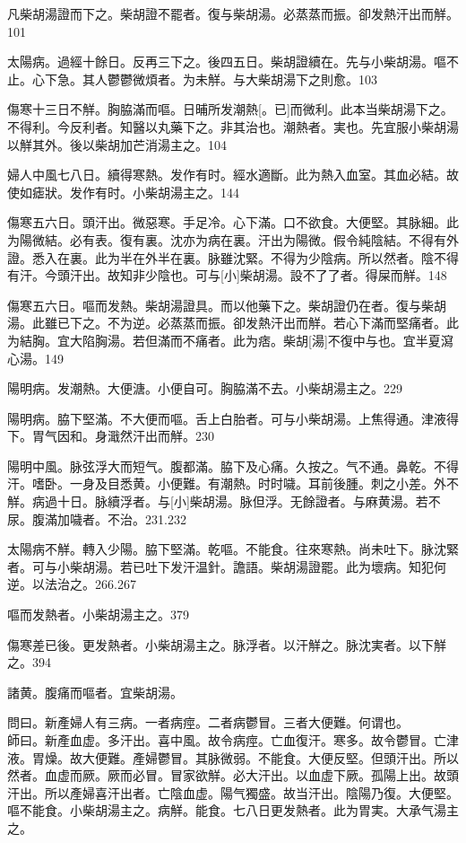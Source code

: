 \documentclass[12pt,oneside,UTF8,b5paper]{ctexbook}她她她她她她她
\begin{document}
凡柴胡湯證而下之。柴胡證不罷者。復与柴胡湯。必蒸蒸而振。卻发熱汗出而觧。101

太陽病。過經十餘日。反再三下之。後四五日。柴胡證續在。先与小柴胡湯。嘔不止。心下急。其人鬱鬱微煩者。为未觧。与大柴胡湯下之則愈。103

傷寒十三日不觧。胸脇滿而嘔。日晡所发潮熱[。已]而微利。此本当柴胡湯下之。不得利。今反利者。知醫以丸藥下之。非其治也。潮熱者。実也。先宜服小柴胡湯以觧其外。後以柴胡加芒消湯主之。104

婦人中風七八日。續得寒熱。发作有时。經水適斷。此为熱入血室。其血必結。故使如瘧狀。发作有时。小柴胡湯主之。144

傷寒五六日。頭汗出。微惡寒。手足冷。心下滿。口不欲食。大便堅。其脉細。此为陽微結。必有表。復有裏。沈亦为病在裏。汗出为陽微。假令純陰結。不得有外證。悉入在裏。此为半在外半在裏。脉雖沈緊。不得为少陰病。所以然者。陰不得有汗。今頭汗出。故知非少陰也。可与[小]柴胡湯。設不了了者。得屎而觧。148

傷寒五六日。嘔而发熱。柴胡湯證具。而以他藥下之。柴胡證仍在者。復与柴胡湯。此雖已下之。不为逆。必蒸蒸而振。卻发熱汗出而觧。若心下滿而堅痛者。此为結胸。宜大陷胸湯。若但滿而不痛者。此为痞。柴胡[湯]不復中与也。宜半夏瀉心湯。149

陽明病。发潮熱。大便溏。小便自可。胸脇滿不去。小柴胡湯主之。229

陽明病。脇下堅滿。不大便而嘔。舌上白胎者。可与小柴胡湯。上焦得通。津液得下。胃气因和。身濈然汗出而觧。230

陽明中風。脉弦浮大而短气。腹都滿。脇下及心痛。久按之。气不通。鼻乾。不得汗。嗜卧。一身及目悉黄。小便難。有潮熱。时时噦。耳前後腫。刺之小差。外不觧。病過十日。脉續浮者。与[小]柴胡湯。脉但浮。无餘證者。与麻黄湯。若不尿。腹滿加噦者。不治。231.232

太陽病不觧。轉入少陽。脇下堅滿。乾嘔。不能食。往來寒熱。尚未吐下。脉沈緊者。可与小柴胡湯。若已吐下发汗温針。譫語。柴胡湯證罷。此为壞病。知犯何逆。以法治之。266.267

嘔而发熱者。小柴胡湯主之。379

傷寒差已後。更发熱者。小柴胡湯主之。脉浮者。以汗觧之。脉沈実者。以下觧之。394

諸黄。腹痛而嘔者。宜柴胡湯。

問曰。新產婦人有三病。一者病痙。二者病鬱冒。三者大便難。何谓也。\\
師曰。新產血虚。多汗出。喜中風。故令病痙。亡血復汗。寒多。故令鬱冒。亡津液。胃燥。故大便難。產婦鬱冒。其脉微弱。不能食。大便反堅。但頭汗出。所以然者。血虚而厥。厥而必冒。冒家欲觧。必大汗出。以血虚下厥。孤陽上出。故頭汗出。所以產婦喜汗出者。亡陰血虚。陽气獨盛。故当汗出。陰陽乃復。大便堅。嘔不能食。小柴胡湯主之。病觧。能食。七八日更发熱者。此为胃実。大承气湯主之。
\end{document}
